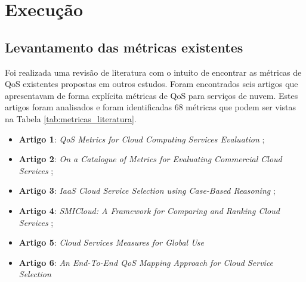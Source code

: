 \documentclass[conference]{IEEEtran}
\begin{document}
\section{Execução} %

  \subsection{Levantamento das métricas existentes}
      
      Foi realizada uma revisão de literatura com o intuito de encontrar as métricas de QoS existentes
      propostas em outros estudos. Foram encontrados seis artigos que apresentavam de forma explícita métricas de QoS para
      serviços de nuvem.  Estes artigos foram analisados e foram identificadas 68 métricas que podem ser vistas na Tabela \ref{tab:metricas_literatura}.
      
      \begin{itemize}
       \item \textbf{Artigo 1}: \textit{QoS Metrics for Cloud Computing Services Evaluation} \cite{bardsiri2014};
       \item \textbf{Artigo 2}: \textit{On a Catalogue of Metrics for Evaluating Commercial Cloud Services} \cite{li2012};
       \item \textbf{Artigo 3}: \textit{IaaS Cloud Service Selection using Case-Based Reasoning} \cite{soltani2016};
       \item \textbf{Artigo 4}: \textit{SMICloud: A Framework for Comparing and Ranking Cloud Services} \cite{garg2011};
       \item \textbf{Artigo 5}: \textit{Cloud Services Measures for Global Use} \cite{siegel2012cloud}
       \item \textbf{Artigo 6}: \textit{An End-To-End QoS Mapping Approach for Cloud Service Selection} \cite{karim2013}
      \end{itemize}
      
\end{document}
